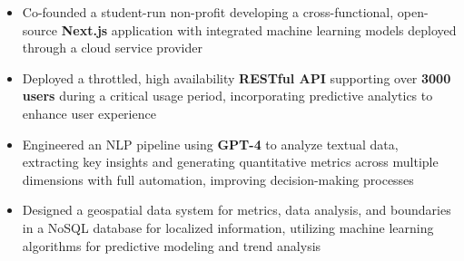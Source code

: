 \begin{itemize}
    \item Co-founded a student-run non-profit developing a cross-functional, open-source \textbf{Next.js} application with integrated machine learning models deployed through a cloud service provider
    \item Deployed a throttled, high availability \textbf{RESTful API} supporting over \textbf{3000 users} during a critical usage period, incorporating predictive analytics to enhance user experience
    \item Engineered an NLP pipeline using \textbf{GPT-4} to analyze textual data, extracting key insights and generating quantitative metrics across multiple dimensions with full automation, improving decision-making processes
    \item Designed a geospatial data system for metrics, data analysis, and boundaries in a NoSQL database for localized information, utilizing machine learning algorithms for predictive modeling and trend analysis
\end{itemize}